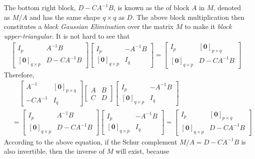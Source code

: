 The bottom right block, $D - CA^{-1}B$, is known as the  of block $A$ in $M$, denoted as $M/A$ and has the same shape $q \times q$ as $D$. The above block multiplication then constitutes a \textit{block Gaussian Elimination} over the matrix $M$ to make it \textit{block upper-triangular}. It is not hard to see that
\begin{align*}
\begin{bmatrix}
I_p & A^{-1}B \\
[\textbf{0}]_{q\times p} & D - CA^{-1}B 
\end{bmatrix}
\begin{bmatrix}
I_p & -A^{-1}B \\
[\textbf{0}]_{q \times p} & I_q
\end{bmatrix}
=
\begin{bmatrix}
I_p & [\textbf{0}]_{p \times q} \\
[\textbf{0}]_{q\times p} & D - CA^{-1}B 
\end{bmatrix}
\end{align*}
Therefore,
\begin{align*}
&\quad \begin{bmatrix}
A^{-1} & [\textbf{0}]_{p\times q} \\
-CA^{-1} & I_q
\end{bmatrix}
\begin{bmatrix}
A & B \\
C & D
\end{bmatrix}
\begin{bmatrix}
I_p & -A^{-1}B \\
[\textbf{0}]_{q \times p} & I_q
\end{bmatrix} \\
&= \begin{bmatrix}
I_p & A^{-1}B \\
[\textbf{0}]_{q\times p} & D - CA^{-1}B 
\end{bmatrix}
\begin{bmatrix}
I_p & -A^{-1}B \\
[\textbf{0}]_{q \times p} & I_q
\end{bmatrix}
=
\begin{bmatrix}
I_p & [\textbf{0}]_{p \times q} \\
[\textbf{0}]_{q\times p} & D - CA^{-1}B 
\end{bmatrix}
\end{align*}
According to the above equation, if the Schur complement $M/A = D-CA^{-1}B$ is also invertible, then the inverse of $M$ will exist, because
